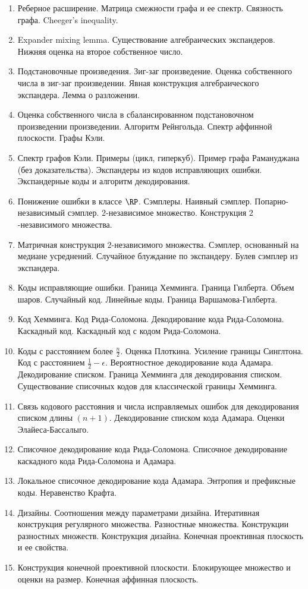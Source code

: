 \begin{enumerate}
    \item Реберное расширение. Матрица смежности графа и ее спектр. Связность графа. Cheeger's inequality.
    \item Expander mixing lemma. Существование алгебраических экспандеров. Нижняя оценка на второе собственное число.
    \item Подстановочные произведения. Зиг-заг произведение. Оценка собственного числа в зиг-заг произведении. Явная
        конструкция алгебраического экспандера. Лемма о разложении. 
    \item Оценка собственного числа в сбалансированном подстановочном произведении произведении. Алгоритм Рейнгольда. Спектр
        аффинной плоскости. Графы Кэли.
    \item Спектр графов Кэли. Примеры (цикл, гиперкуб). Пример графа Рамануджана (без доказательства). Экспандеры из кодов
        исправляющих ошибки. Экспандерные коды и алгоритм декодирования.
    \item Понижение ошибки в классе $\RP$. Сэмплеры. Наивный сэмплер. Попарно-независимый сэмплер. $2$-независимое
        множество. Конструкция $2$-независимого множества.
    \item Матричная конструкция $2$-независимого множества. Сэмплер, основанный на медиане усреднений. Случайное блуждание
        по экспандеру. Булев сэмплер из экспандера.
    \item Коды исправляющие ошибки. Граница Хемминга. Граница Гилберта. Объем шаров. Случайный код. Линейные коды. Граница
        Варшамова-Гилберта.
    \item Код Хемминга. Код Рида-Соломона. Декодирование кода Рида-Соломона. Каскадный код. Каскадный код с кодом
        Рида-Соломона.
    \item Коды с расстоянием более $\frac{n}{2}$. Оценка Плоткина. Усиление границы Синглтона. Код с расстоянием $\frac{1}{2}
        - \epsilon$. Вероятностное декодирование кода Адамара. Декодирование списком. Граница Хемминга для декодирования
        списком. Существование списочных кодов для классической границы Хемминга.
	\item Связь кодового расстояния и числа исправляемых ошибок для декодирования списком длины $(n + 1)$. Декодирование
        списком кода Адамара. Оценки Элайеса-Бассалыго.
    \item Списочное декодирование кода Рида-Соломона. Списочное декодирование каскадного кода Рида-Соломона и Адамара.
    \item Локальное списочное декодирование кода Адамара. Энтропия и префиксные коды. Неравенство Крафта.
    \item Дизайны. Соотношения между параметрами дизайна. Итеративная конструкция регулярного множества. Разностные
        множества. Конструкции разностных множеств. Конструкция дизайна. Конечная проективная плоскость и ее свойства.
    \item Конструкция конечной проективной плоскости. Блокирующее множество и оценки на размер. Конечная аффинная
        плоскость.
\end{enumerate}

